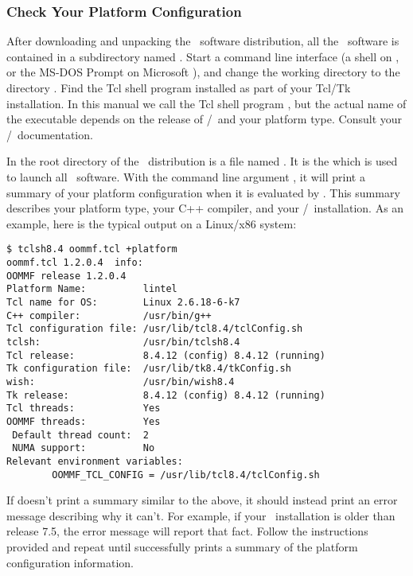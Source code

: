 \subsubsection{Check Your Platform Configuration}

After downloading and unpacking the \OOMMF\ software distribution, all
the \OOMMF\ software is contained in a subdirectory named .
Start a command line interface (a shell on \Unix, or the MS-DOS Prompt 
on Microsoft \Windows), and change the 
working directory to the 
directory .  
Find the Tcl shell program installed as part of your Tcl/Tk 
installation.  In this manual we call the Tcl shell program
, but the actual name of the executable depends
on the release of \Tcl/\Tk\ and your platform type.  Consult
your \Tcl/\Tk\ documentation.

In the root directory of the \OOMMF\ distribution is a file
named .  It is the 
which is used to launch all \OOMMF\ software.  With the command line
argument , 
it will print a summary of your
platform configuration when it is evaluated by .
This summary describes your platform type, your C++ compiler,
and your \Tcl/\Tk\ installation.  As an example, 
here is the typical output on a Linux/x86 system:
\begin{verbatim}
$ tclsh8.4 oommf.tcl +platform
oommf.tcl 1.2.0.4  info:
OOMMF release 1.2.0.4
Platform Name:          lintel
Tcl name for OS:        Linux 2.6.18-6-k7
C++ compiler:           /usr/bin/g++ 
Tcl configuration file: /usr/lib/tcl8.4/tclConfig.sh
tclsh:                  /usr/bin/tclsh8.4
Tcl release:            8.4.12 (config) 8.4.12 (running)
Tk configuration file:  /usr/lib/tk8.4/tkConfig.sh
wish:                   /usr/bin/wish8.4
Tk release:             8.4.12 (config) 8.4.12 (running)
Tcl threads:            Yes
OOMMF threads:          Yes
 Default thread count:  2
 NUMA support:          No
Relevant environment variables:
        OOMMF_TCL_CONFIG = /usr/lib/tcl8.4/tclConfig.sh
\end{verbatim}

If  doesn't print a summary similar to the
above, it should instead print an error message describing why it can't.
For example, if your \Tcl\ installation is older than release 7.5, the
error message will report that fact.  Follow the instructions provided
and repeat until  successfully prints a summary
of the platform configuration information.

